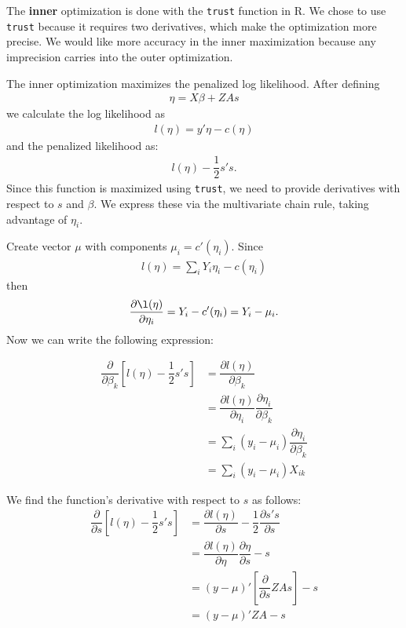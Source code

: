 \documentclass{article}
\begin{document}
The {\bf inner} optimization is done with the \texttt{trust} function in R. We chose to use \texttt{trust} because it requires two derivatives, which  make the optimization more precise. We would like more accuracy in the inner maximization because any imprecision carries into the outer optimization.

The inner optimization maximizes the penalized log likelihood. After defining
\begin{align}
\eta=X\beta +ZAs
\end{align}
we calculate the  log likelihood as 
\begin{align}
l(\eta)= y' \eta - c(\eta) 
\end{align}
and the penalized likelihood as:
\begin{align}
 l(\eta)- \dfrac{1}{2} s's.
\end{align}
Since this function is maximized using  \texttt{trust}, we need to provide derivatives with respect to $s$ and $\beta$. We express these via the multivariate chain rule, taking advantage of $\eta_i$.

Create  vector $\mu$ with components $\mu_i=c'(\eta_i)$.  Since
\begin{align}
l(\eta) = \sum_i Y_i \eta_i - c(\eta_i)
\end{align}
then 
\begin{align}
\dfrac{\partial \l(\eta)}{\partial \eta_i} = Y_i-c'(\eta_i) = Y_i -\mu_i.
\end{align}
 Now we can write the following expression:

\begin{align}
\dfrac{\partial}{\partial \beta_k} \left[ l(\eta)-\dfrac{1}{2} s's  \right] &= \dfrac{\partial l(\eta)}{\partial \beta_k}    \\
&= \dfrac{\partial l(\eta)}{\partial \eta_i} \dfrac{\partial \eta_i}{\partial \beta_k}    \\
&=\sum_i (y_i-\mu_i) \dfrac{\partial \eta_i}{\partial \beta_k} \\
&=\sum_i (y_i-\mu_i) X_{ik}
\end{align}


We find the function's derivative with respect to $s$ as follows:
\begin{align}
\dfrac{\partial }{\partial s} \left[ l(\eta) -\dfrac{1}{2} s's   \right] &= \dfrac{\partial l(\eta)}{\partial s} -\dfrac{1}{2} \dfrac{\partial s's}{\partial s}\\
&= \dfrac{\partial l(\eta)}{\partial \eta} \dfrac{\partial \eta}{\partial s} -s\\
&= (y-\mu)' \left[ \dfrac{\partial}{\partial s} ZAs \right] -s\\
&=(y-\mu)'ZA -s
\end{align}
\end{document}
